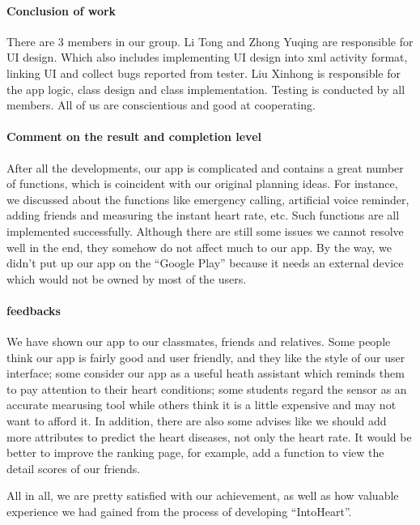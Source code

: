 \paragraph{Conclusion of work}
There are 3 members in our group. Li Tong and Zhong Yuqing are responsible for UI design. Which also includes implementing UI design into xml activity format, linking UI and collect bugs reported from tester. Liu Xinhong is responsible for the app logic, class design and class implementation. Testing is conducted by all members.  All of us are conscientious and good at cooperating. 
                                
\paragraph{Comment on the result and completion level}
After all the developments, our app is complicated and contains a great number of functions, which is coincident with our original planning ideas. For instance, we discussed about the functions like emergency calling, artificial voice reminder, adding friends and measuring the instant heart rate, etc. Such functions are all implemented successfully. Although there are still some issues we cannot resolve well in the end,  they somehow do not affect much to our app. By the way, we didn’t put up our app on the “Google Play” because it needs an external device which would not be owned by most of the users.  
 
\paragraph{feedbacks}
We have shown our app to our classmates, friends and relatives. Some people think our app is fairly good and user friendly, and they like the style of our user interface; some consider our app as a useful heath assistant which reminds them to pay attention to their heart conditions; some students regard the sensor as an accurate mearusing tool while others think it is a little expensive and may not want to afford it. In addition, there are also some advises like we should add more attributes to predict the heart diseases, not only the heart rate. It would be better to improve the ranking page, for example, add a function to view the detail scores of our friends. 

All in all, we are pretty satisfied with our achievement, as well as how valuable experience we had gained from the process of developing “IntoHeart”. 
